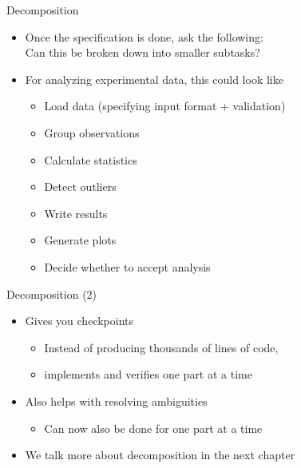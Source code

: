 \documentclass[
ps,
]{prosper}
\begin{document}
\begin{slide}{Decomposition}

\begin{itemize}

\item Once the specification is done, ask the following: \\
  Can this be broken down into smaller subtasks?

\item For analyzing experimental data, this could look like

\begin{itemize}

\item Load data (specifying input format + validation)

\item Group observations

\item Calculate statistics

\item Detect outliers

\item Write results

\item Generate plots

\item Decide whether to accept analysis

\end{itemize}
  
\end{itemize}
  
\end{slide}




\begin{slide}{Decomposition (2)}

\begin{itemize}

\item Gives you checkpoints

  \begin{itemize}
    
  \item Instead of producing thousands of lines of code,

  \item implements and verifies one part at a time
    
  \end{itemize}

\item Also helps with resolving ambiguities

\begin{itemize}

\item Can now also be done for one part at a time

\end{itemize}

\item We talk more about decomposition in the next chapter

\end{itemize}
  
\end{slide}
\end{document}
